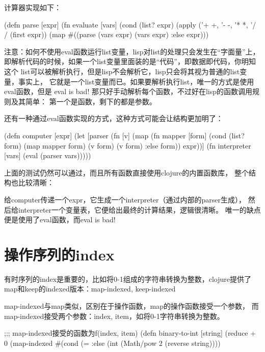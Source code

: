 \documentclass[a4paper,11pt]{article}
\begin{document}
  计算器实现如下：\par
  \begin{schemecode}
(defn parse
  [expr]
  (fn evaluate
    [vars]
    (cond
     (list? expr) (apply ({'+ +, '- -, '* *, '/ /} (first expr))
                         (map #((parse %
     (vars expr) (vars expr)
     :else expr)))
  \end{schemecode}

  注意：如何不使用eval函数运行list变量，lisp对list的处理只会发生在“字面量”上，
  即解析代码的时候，如果一个list变量里面装的是“代码”，即数据即代码，你明知这个
  list可以被解析执行，但是lisp不会解析它，lisp只会将其视为普通的list变量，事实上，
  它就是一个list变量而已。如果要解析执行list，唯一的方式是使用eval函数，但是
  eval is bad! 那只好手动解析每个函数，不过好在lisp的函数调用规则及其简单：
  第一个是函数，剩下的都是参数。
  
  还有一种通过eval函数实现的方式，这种方式可能会让结构更加明了：

  \begin{schemecode}
(defn computer
  [expr]
  (let [parser (fn [v]
                 (map (fn mapper [form]
                        (cond
                         (list? form) (map mapper form)
                         (v form) (v form)
                         :else form))
                      expr))]
    (fn interpreter [vars]
      (eval (parser vars)))))
  \end{schemecode}

  上面的测试仍然可以通过，而且所有函数直接使用clojure的内置函数库，
  整个结构也比较清晰：\par
  给computer传递一个expr，它生成一个interpreter（通过内部的parser生成），
  然后给interpreter一个变量表，它便给出最终的计算结果，逻辑很清晰。
  唯一的缺点便是使用了eval函数，而eval is bad!


  \section[操作序列的index]{操作序列的index}
  有时序列的index是重要的，比如将0-1组成的字符串转换为整数，clojure提供了
  map和keep的indexed版本：map-indexed, keep-indexed\par
  map-indexed与map类似，区别在于操作函数，map的操作函数接受一个参数，
  而map-indexed接受两个参数：index, item，如将0-1字符串转换为整数。

  \begin{schemecode}
;;; map-indexed接受的函数为f(index, item)
(defn binary-to-int
  [string]
  (reduce + 0
          (map-indexed #(cond
                         (= %
                         :else (int (Math/pow 2 %
                       (reverse string))))
  \end{schemecode}
\end{document}
